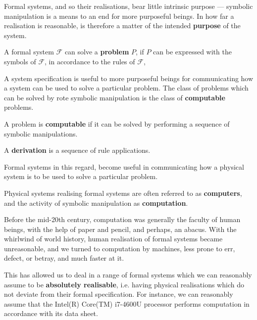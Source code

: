 \pagebreak

Formal systems, and so their realisations, bear little intrinsic purpose ---
symbolic manipulation is a means to an end for more purposeful beings. In how
far a realisation is reasonable, is therefore a matter of the intended
\textbf{purpose} of the system.

\begin{notion}

A formal system $\mathcal{F}$ can solve a \textbf{problem} $P$, if $P$ can be
expressed with the symbols of $\mathcal{F}$, in accordance to the rules of
$\mathcal{F}$, 

\end{notion}

A system specification is useful to more purposeful beings for communicating
how a system can be used to solve a particular problem. The class of problems
which can be solved by rote symbolic manipulation is the class of
\textbf{computable} problems.

\begin{definition}

A problem is \textbf{computable} if it can be solved by performing a sequence
of symbolic manipulations.

\end{definition}

\begin{definition}

A \textbf{derivation} is a sequence of rule applications.

\end{definition}

\newpage

Formal
systems in this regard, become useful in communicating how a physical system is
to be used to solve a particular problem.


Physical systems realising formal systems are often referred to as
\textbf{computers}, and the activity of symbolic manipulation as
\textbf{computation}.

Before the mid-20th century, computation was generally the faculty of human
beings, with the help of paper and pencil, and perhaps, an abacus. With the
whirlwind of world history, human realisation of formal systems became
unreasonable, and we turned to computation by machines, less prone to err,
defect, or betray, and much faster at it.

This has allowed us to deal in a range of formal systems which we can
reasonably assume to be \textbf{absolutely realisable}, i.e. having physical
realisations which do not deviate from their formal specification. For
instance, we can reasonably assume that the Intel(R) Core(TM) i7-4600U
processor performs computation in accordance with its data sheet.

